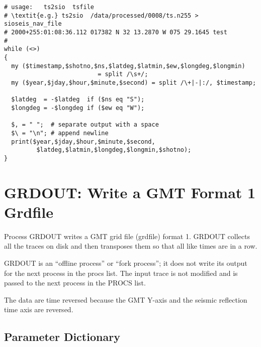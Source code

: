 \lstset{language=Perl}
\begin{lstlisting}[caption={ts2sio.pl},label=lts2sio]
# usage:   ts2sio  tsfile
# \textit{e.g.} ts2sio  /data/processed/0008/ts.n255 > sioseis_nav_file
# 2000+255:01:08:36.112 017382 N 32 13.2870 W 075 29.1645 test
#
while (<>)
{
  my ($timestamp,$shotno,$ns,$latdeg,$latmin,$ew,$longdeg,$longmin)
                          = split /\s+/;
  my ($year,$jday,$hour,$minute,$second) = split /\+|-|:/, $timestamp;

  $latdeg  = -$latdeg  if ($ns eq "S");
  $longdeg = -$longdeg if ($ew eq "W");

  $, = " ";  # separate output with a space
  $\ = "\n"; # append newline
  print($year,$jday,$hour,$minute,$second,
         $latdeg,$latmin,$longdeg,$longmin,$shotno);
}
\end{lstlisting}

\section{GRDOUT: Write a GMT Format 1 Grdfile}
\label{cmd_grdout}

     Process GRDOUT writes a GMT grid file (grdfile) format 1.
GRDOUT collects all the traces on disk and then transposes them
so that all like times are in a row.

     GRDOUT is an ``offline process'' or ``fork process''; it does
not write its output for the next process in the procs list.
The input trace is not modified and is passed to the next
process in the PROCS list.

     The data are time reversed because the GMT Y-axis and the
seismic reflection time axis are reversed.


\subsection{Parameter Dictionary}

